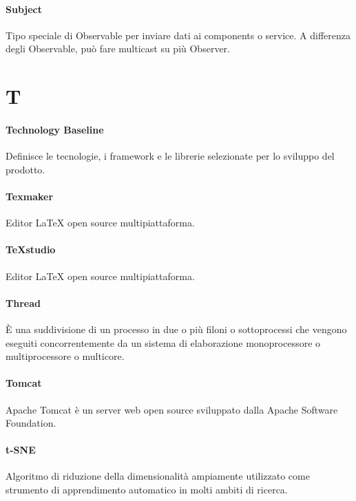 \documentclass[]{article}
\begin{document}
	\paragraph*{Subject}
	Tipo speciale di Observable per inviare dati ai components o service. A differenza degli Observable, può fare multicast su più Observer.	

	\newpage

	\section*{T}

	\paragraph*{Technology Baseline}
	Definisce le tecnologie, i framework e le librerie selezionate per lo sviluppo del prodotto.

	\paragraph*{Texmaker}
	Editor LaTeX open source multipiattaforma.

	\paragraph*{TeXstudio}
	Editor LaTeX open source multipiattaforma.

	\paragraph*{Thread}
	È una suddivisione di un processo in due o più filoni o sottoprocessi che vengono eseguiti concorrentemente da un sistema di elaborazione monoprocessore o multiprocessore o multicore.

	\paragraph*{Tomcat}
	Apache Tomcat è un server web open source sviluppato dalla Apache Software Foundation.

	\paragraph*{t-SNE}
	Algoritmo di riduzione della dimensionalità ampiamente utilizzato come strumento di apprendimento automatico in molti ambiti di ricerca.
\end{document}
